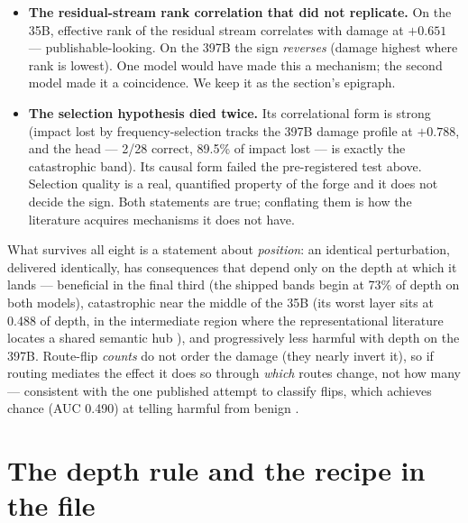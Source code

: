\documentclass[10pt]{article} %
\begin{document}
\begin{itemize}
\item \textbf{The residual-stream rank correlation that did not replicate.} On the 35B,
  effective rank of the residual stream correlates with damage at $+0.651$ ---
  publishable-looking. On the 397B the sign \emph{reverses} (damage highest where
  rank is lowest). One model would have made this a mechanism; the second
  model made it a coincidence. We keep it as the section's epigraph.
\item \textbf{The selection hypothesis died twice.} Its correlational form is strong
  (impact lost by frequency-selection tracks the 397B damage profile at
  $+0.788$, and the head --- 2/28 correct, 89.5\% of impact lost --- is exactly the
  catastrophic band). Its causal form failed the pre-registered test above.
  Selection quality is a real, quantified property of the forge and it does
  not decide the sign. Both statements are true; conflating them is how the
  literature acquires mechanisms it does not have.
\end{itemize}

What survives all eight is a statement about \emph{position}: an identical
perturbation, delivered identically, has consequences that depend only on the
depth at which it lands --- beneficial in the final third (the shipped bands
begin at 73\% of depth on both models), catastrophic near the middle of the
35B (its worst layer sits at 0.488 of depth, in the intermediate region where
the representational literature locates a shared semantic hub
\citep{wu2025semantichub}), and progressively less harmful with depth on the
397B. Route-flip \emph{counts} do not order the damage (they nearly invert it), so
if routing mediates the effect it does so through \emph{which} routes change, not
how many --- consistent with the one published attempt to classify flips, which
achieves chance (AUC 0.490) at telling harmful from benign \citep{gu2026routeflip}.

\section{The depth rule and the recipe in the file}
\label{sec:depthrule}
\end{document}
